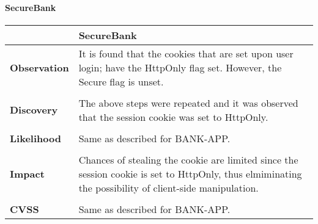 \clearpage
\paragraph{SecureBank} \mbox{}
\begin{longtable*}{p{.20\textwidth} | p{.80\textwidth}}
    \hline
    & \textbf{SecureBank} \\
    \hline
    \textbf{Observation} &
        It is found that the cookies that are set upon user login; have the HttpOnly flag set. However, the Secure flag is unset.
    \\\\
    \textbf{Discovery} &
	   The above steps were repeated and it was observed that the session cookie was set to HttpOnly.
    \\\\
    \textbf{Likelihood} &
      Same as described for BANK-APP.
    \\\\
    \textbf{Impact} &
      Chances of stealing the cookie are limited since the session cookie is set to HttpOnly, thus elmiminating the possibility of client-side manipulation.
    \\\\
    \textbf{CVSS} &
      Same as described for BANK-APP.
    \\
    \hline
\end{longtable*}
\clearpage